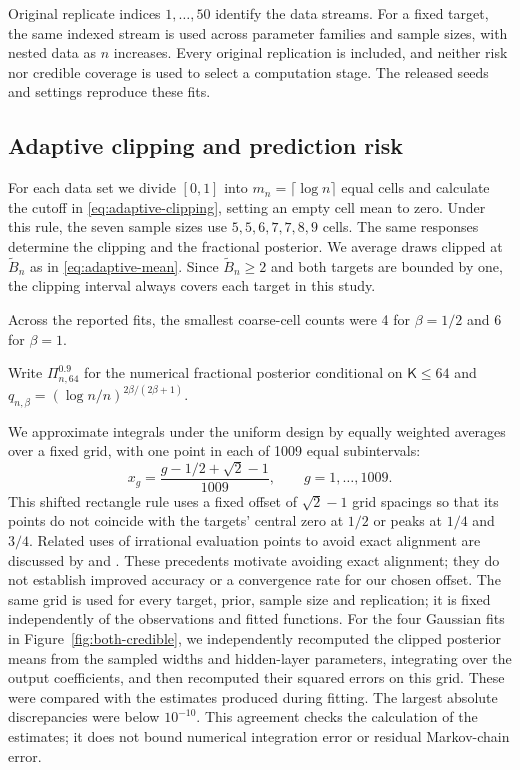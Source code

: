 \documentclass[11pt,a4paper]{article}
\theoremstyle{remark}
\begin{document}
{Original replicate indices $1,\ldots,50$ identify the data streams. For a fixed target, the same indexed stream is used across parameter families and sample sizes, with nested data as $n$ increases. Every original replication is included, and neither risk nor credible coverage is used to select a computation stage. The released seeds and settings reproduce these fits.}

\subsection{Adaptive clipping and prediction risk}
\label{app:simulation-adaptive-risk}
For each data set we divide $[0,1]$ into $m_n=\lceil\log n\rceil$
equal cells and calculate the cutoff in \eqref{eq:adaptive-clipping}, setting an empty
cell mean to zero. Under this rule, the seven sample sizes use
$5,5,6,7,7,8,9$ cells.
The same responses determine the clipping and the fractional posterior.
We average draws clipped at $\widetilde B_n$ as in
\eqref{eq:adaptive-mean}. Since $\widetilde B_n\geq2$ and both
{targets are bounded by one, the clipping interval always covers each
target in this study.}

{Across the reported fits, the smallest coarse-cell counts were 4 for $\beta=1/2$ and 6 for $\beta=1$.}

Write
$\Pi_{n,64}^{0.9}$ for the numerical
fractional posterior conditional on $\mathsf K\leq64$ and
$q_{n,\beta}=(\log n/n)^{2\beta/(2\beta+1)}$.

We approximate integrals under the uniform design by equally weighted
averages over a fixed grid, with one point in each of 1009 equal
subintervals:
\begin{equation}\label{eq:simulation-grid}
x_g=\frac{g-1/2+\sqrt2-1}{1009},\qquad g=1,\ldots,1009.
\end{equation}
This shifted rectangle rule uses a fixed offset of $\sqrt2-1$ grid
spacings so that its points do not coincide with the targets' central
zero at $1/2$ or peaks at $1/4$ and $3/4$.
Related uses of irrational evaluation points to avoid exact alignment
are discussed by \citet{bartuska2025} and \citet{shampine2008}.
These precedents motivate avoiding exact alignment; they do not
establish improved accuracy or a convergence rate for our chosen offset.
The same grid is used for every target, prior, sample size
and replication; it is fixed independently of the observations and
fitted functions. For the four Gaussian fits in
Figure~\ref{fig:both-credible}, we independently recomputed the clipped
posterior means from the sampled widths and hidden-layer parameters,
integrating over the output coefficients, and then recomputed their
squared errors on this grid. These were compared with the estimates
produced during fitting.
The largest absolute discrepancies were below $10^{-10}$.
This agreement checks the calculation of the estimates; it does not
bound numerical integration error or residual Markov-chain error.
\end{document}
